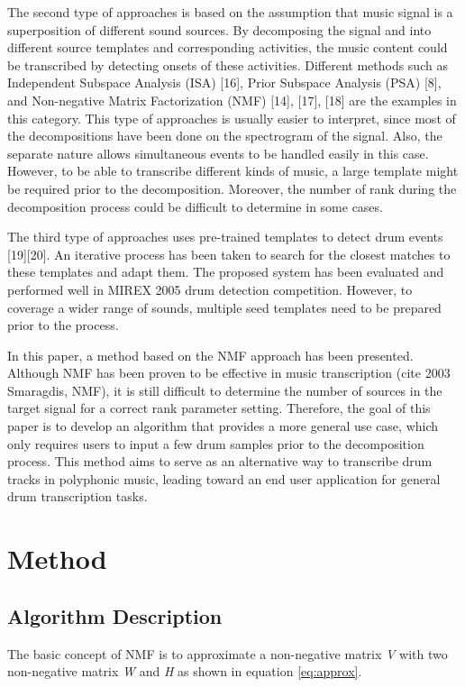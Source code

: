 \documentclass{article}
\begin{document}
The second type of approaches is based on the assumption that music signal is a superposition of different sound sources. By decomposing the signal and into different source templates and corresponding activities, the music content could be transcribed by detecting onsets of these activities. Different methods such as Independent Subspace Analysis (ISA) [16], Prior Subspace Analysis (PSA) [8], and Non-negative Matrix Factorization (NMF) [14], [17], [18] are the examples in this category. This type of approaches is usually easier to interpret, since most of the decompositions have been done on the spectrogram of the signal. Also, the separate nature allows simultaneous events to be handled easily in this case. However, to be able to transcribe different kinds of music, a large template might be required prior to the decomposition. Moreover, the number of rank during the decomposition process could be difficult to determine in some cases. 

The third type of approaches uses pre-trained templates to detect drum events [19][20]. An iterative process has been taken to search for the closest matches to these templates and adapt them. The proposed system has been evaluated and performed well in MIREX 2005 drum detection competition. However, to coverage a wider range of sounds, multiple seed templates need to be prepared prior to the process.

In this paper, a method based on the NMF approach has been presented. Although NMF has been proven to be effective in music transcription (cite 2003 Smaragdis, NMF), it is still difficult to determine the number of sources in the target signal for a correct rank parameter setting. Therefore, the goal of this paper is to develop an algorithm that provides a more general use case, which only requires users to input a few drum samples prior to the decomposition process. This method aims to serve as an alternative way to transcribe drum tracks in polyphonic music, leading toward an end user application for general drum transcription tasks.  
 
\section{Method}\label{sec:method}
\subsection{Algorithm Description}\label{subsec:algorithm description}
The basic concept of NMF is to approximate a non-negative matrix {\itshape V} with two non-negative matrix {\itshape W} and {\itshape H} as shown in equation \eqref{eq:approx}.
\end{document}
